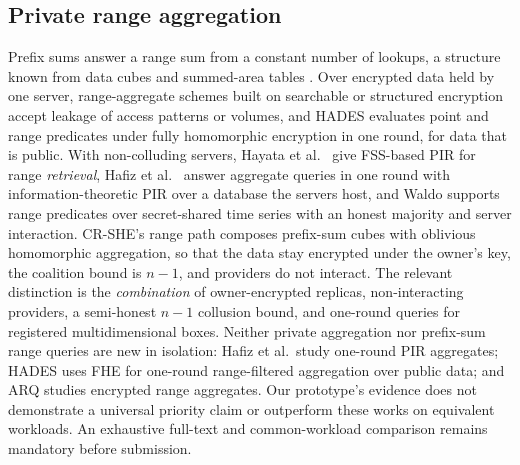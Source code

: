 \documentclass[a4paper,fleqn]{cas-sc}
\begin{document}
\subsection{Private range aggregation}
Prefix sums answer a range sum from a constant number of lookups, a structure
known from data cubes \citep{ho1997range} and summed-area tables
\citep{crow1984summed}. Over encrypted data held by one server, range-aggregate
schemes built on searchable or structured encryption
\citep{demertzis2018practical,espiritu2022arq} accept leakage of access
patterns or volumes, and HADES \citep{liu2025hades} evaluates point and range
predicates under fully homomorphic encryption in one round, for data that is
public. With non-colluding servers, Hayata et al.\ \citep{hayata2020private}
give FSS-based PIR for range \emph{retrieval}, Hafiz et
al.\ \citep{hafiz2024private} answer aggregate queries in one round with
information-theoretic PIR over a database the servers host, and Waldo
\citep{waldo} supports range predicates over secret-shared time series with an
honest majority and server interaction. CR-SHE's range path composes prefix-sum
cubes with oblivious homomorphic aggregation, so that the data stay encrypted
under the owner's key, the coalition bound is $n-1$, and providers do not
interact. The relevant distinction is the \emph{combination} of owner-encrypted
replicas, non-interacting providers, a semi-honest $n-1$ collusion bound,
and one-round queries for registered multidimensional boxes. Neither
private aggregation nor prefix-sum range queries are new in isolation:
Hafiz et al.\ study one-round PIR aggregates; HADES uses FHE for
one-round range-filtered aggregation over public data; and ARQ
studies encrypted range aggregates. Our prototype's evidence does
not demonstrate a universal priority claim or outperform these works
on equivalent workloads. An exhaustive full-text and common-workload
comparison remains mandatory before submission.
\end{document}
